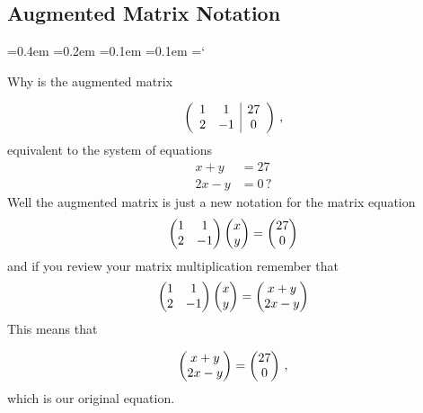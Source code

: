 \subsection*{Augmented Matrix Notation}

{\ttfamily
{}\font=0.4em
\font=0.2em
\font=0.1em
\font=0.1em
\hyphenchar\font=`\-


\hypertarget{script_gaussian_elimination_more}{Why is the augmented  matrix} 
\[ \left( \begin{array}{cc | c}
1 & 1 & 27 \\
2 & -1 & 0  
\end{array} \right)\, ,
\]
equivalent to the system of equations
\begin{align*}
 x+y &= 27\\
 2x - y &= 0\, ?
\end{align*}
Well the augmented matrix is just a new notation for the matrix equation
\begin{equation*}
    \begin{pmatrix}
      1             &1  \\
      2             &-1
    \end{pmatrix}
  \begin{pmatrix} x \\ y \end{pmatrix}
  =
  \begin{pmatrix} 27 \\ 0 \end{pmatrix}
\end{equation*}
and if you review your matrix multiplication remember that 
\begin{equation*}
    \begin{pmatrix}
      1             &1  \\
      2             &-1
    \end{pmatrix}
  \begin{pmatrix} x \\ y \end{pmatrix}
  =
  \begin{pmatrix} x+ y \\ 2x - y \end{pmatrix}
\end{equation*}
This means that

\begin{equation*}
  \begin{pmatrix} x+ y \\ 2x - y \end{pmatrix}
  =
  \begin{pmatrix} 27 \\ 0 \end{pmatrix}\, ,
\end{equation*}
which is our original equation.

}

